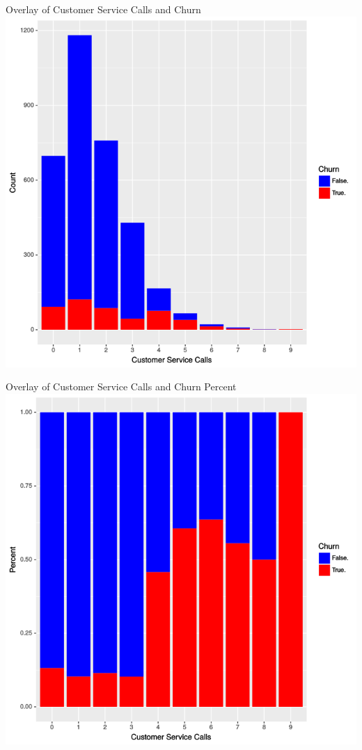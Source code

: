 \documentclass[handout]{beamer}
\begin{document}
\begin{frame}{Overlay of Customer Service Calls and Churn}
    \centering
    \includegraphics[height=0.8\textheight]{images/overlay-customer-calls}    
\end{frame}

\begin{frame}{Overlay of Customer Service Calls and Churn Percent}
    \centering
    \includegraphics[height=0.8\textheight]{images/overlay-customer-calls-percent}
\end{frame}
\end{document}
